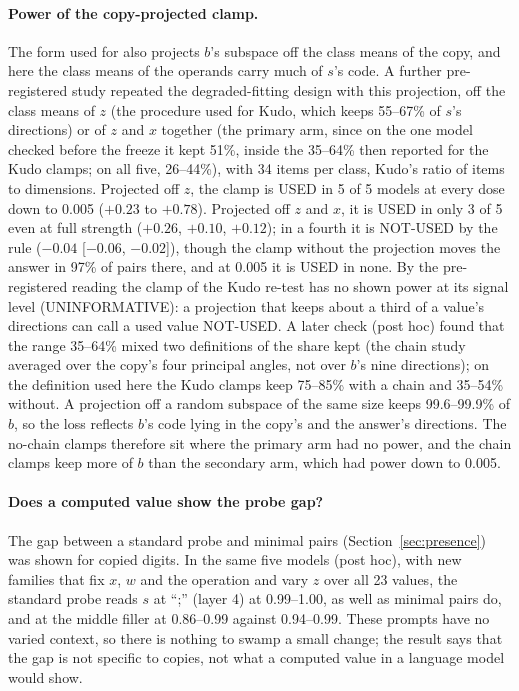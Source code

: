 \documentclass{article}
\begin{document}
\paragraph{Power of the copy-projected clamp.} The form used for \citet{kudo2026} also projects $b$'s subspace off the class means of the copy, and here the class means of the operands carry much of $s$'s code. A further pre-registered study repeated the degraded-fitting design with this projection, off the class means of $z$ (the procedure used for Kudo, which keeps 55--67\% of $s$'s directions) or of $z$ and $x$ together (the primary arm, since on the one model checked before the freeze it kept 51\%, inside the 35--64\% then reported for the Kudo clamps; on all five, 26--44\%), with 34 items per class, Kudo's ratio of items to dimensions. Projected off $z$, the clamp is USED in 5 of 5 models at every dose down to 0.005 ($+0.23$ to $+0.78$). Projected off $z$ and $x$, it is USED in only 3 of 5 even at full strength ($+0.26$, $+0.10$, $+0.12$); in a fourth it is NOT-USED by the rule ($-0.04$ [$-0.06$, $-0.02$]), though the clamp without the projection moves the answer in 97\% of pairs there, and at 0.005 it is USED in none. By the pre-registered reading the clamp of the Kudo re-test has no shown power at its signal level (UNINFORMATIVE): a projection that keeps about a third of a value's directions can call a used value NOT-USED. A later check (post hoc) found that the range 35--64\% mixed two definitions of the share kept (the chain study averaged over the copy's four principal angles, not over $b$'s nine directions); on the definition used here the Kudo clamps keep 75--85\% with a chain and 35--54\% without. A projection off a random subspace of the same size keeps 99.6--99.9\% of $b$, so the loss reflects $b$'s code lying in the copy's and the answer's directions. The no-chain clamps therefore sit where the primary arm had no power, and the chain clamps keep more of $b$ than the secondary arm, which had power down to 0.005.

\paragraph{Does a computed value show the probe gap?} The gap between a standard probe and minimal pairs (Section~\ref{sec:presence}) was shown for copied digits. In the same five models (post hoc), with new families that fix $x$, $w$ and the operation and vary $z$ over all 23 values, the standard probe reads $s$ at ``;'' (layer 4) at 0.99--1.00, as well as minimal pairs do, and at the middle filler at 0.86--0.99 against 0.94--0.99. These prompts have no varied context, so there is nothing to swamp a small change; the result says that the gap is not specific to copies, not what a computed value in a language model would show.
\end{document}

